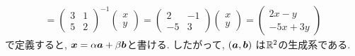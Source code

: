 \begin{example}
\begin{align*}
=
    \begin{pmatrix}
      3&1\\5&2
    \end{pmatrix}^{-1}
    \begin{pmatrix}
      x\\y
    \end{pmatrix}
=
    \begin{pmatrix}
      2&-1\\-5&3
    \end{pmatrix}
    \begin{pmatrix}
      x\\y
    \end{pmatrix}
=
    \begin{pmatrix}
      2x-y\\-5x+3y
    \end{pmatrix}
  \end{align*}
  で定義すると,
  $\boldsymbol{x}=\alpha\boldsymbol{a}+\beta\boldsymbol{b}$と書ける.
  したがって,
  $(\boldsymbol{a},\boldsymbol{b})$ は$\mathbb{R}^2$の生成系である.
\end{example}


